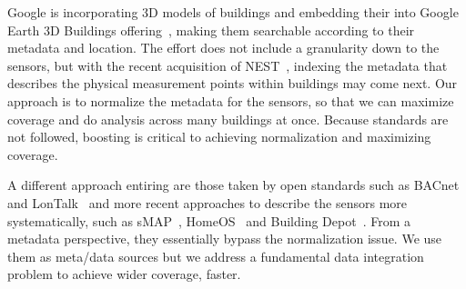 Google is incorporating 3D models of buildings and embedding their into Google 
Earth 3D Buildings offering~\cite{google_3dbuildings}, making them searchable according 
to their metadata and location.
The effort does not include a granularity down to the sensors, but with the recent acquisition
of NEST~\cite{nest}, indexing the metadata that describes the physical measurement points
within buildings may come next.  Our approach is to normalize the metadata for the sensors,
so that we can maximize coverage and do analysis across many buildings at once.  Because standards
are not followed, boosting is critical to achieving normalization and maximizing coverage.

A different approach entiring are those taken by open standards such as BACnet and 
LonTalk~\cite{bacnet, lontalk} and more recent approaches to describe the sensors more
systematically, such as sMAP~\cite{smap}, HomeOS~\cite{homeos} and Building Depot~\cite{BDepot}.  From a metadata perspective, they
essentially bypass the normalization issue.  We use them as meta/data sources but we address a
fundamental data integration problem to achieve wider coverage, faster.
